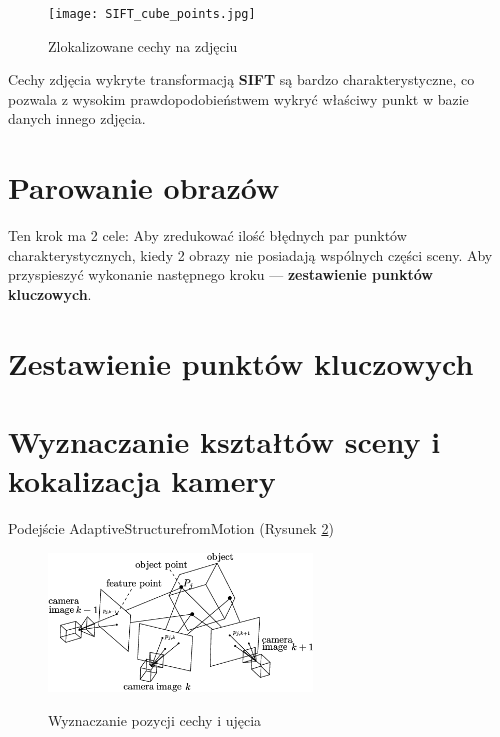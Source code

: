       \begin{figure}[h]
         \centering
         \texttt{[image: SIFT\_cube\_points.jpg]}
         \label {fig:SIFT_points}
         \caption{Zlokalizowane cechy na zdjęciu}
      \end{figure}

Cechy zdjęcia wykryte transformacją \textbf{SIFT} są bardzo charakterystyczne, co pozwala z wysokim prawdopodobieństwem wykryć właściwy punkt w bazie danych innego zdjęcia.

\section{Parowanie obrazów}
Ten krok ma 2 cele:
Aby zredukować ilość błędnych par punktów charakterystycznych, kiedy 2 obrazy nie posiadają wspólnych części sceny.
Aby przyspieszyć wykonanie następnego kroku --- \textbf{zestawienie punktów kluczowych}.

\section{Zestawienie punktów kluczowych}

\section{Wyznaczanie kształtów sceny i kokalizacja kamery}
Podejście AdaptiveStructurefromMotion (Rysunek \ref{fig:SfM})

\begin{figure}[h]
   \centering
   \includegraphics[width=7cm]{SfM.png}
   \label {fig:SfM}
   \caption{Wyznaczanie pozycji cechy i ujęcia}
\end{figure}

\fi
